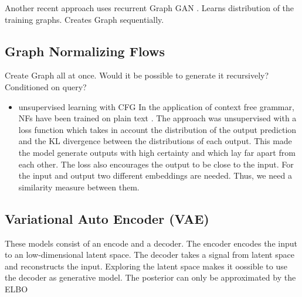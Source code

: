 Another recent approach uses recurrent Graph GAN \cite{li_learning_2018}. Learns distribution of the training graphs. Creates Graph sequentially.

\subsection{Graph Normalizing Flows}
Create Graph all at once. Would it be possible to generate it recursively? Conditioned on query?
\begin{itemize}
    \item unsupervised learning with CFG
    In the application of context free grammar, NFs have been trained on plain text \cite{jin_unsupervised_2019}. The approach was unsupervised with a loss function which takes in account the distribution of the output prediction and the KL divergence between the distributions of each output. This made the model generate outputs with high certainty and which lay far apart from each other. The loss also encourages the output to be close to the input. For the input and output two different embeddings are needed. Thus, we need a similarity measure between them.
    
\end{itemize}

\subsection{Variational Auto Encoder (VAE)}

These models consist of an encode and a decoder. The encoder encodes the input to an low-dimensional latent space. The decoder takes a signal from latent space and reconstructs the input. 
Exploring the latent space makes it oossible to use the decoder as generative model.
The posterior can only be approximated by the ELBO
